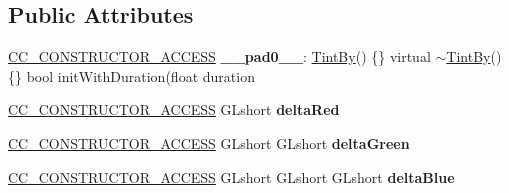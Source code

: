 \subsection*{Public Attributes}
\begin{DoxyCompactItemize}
\item 
\mbox{\label{classTintBy_a6f64181fb1cf3d990e27d955b9ebe9f1}} 
\hyperlink{_2cocos2d_2cocos_2base_2ccConfig_8h_a25ef1314f97c35a2ed3d029b0ead6da0}{C\+C\+\_\+\+C\+O\+N\+S\+T\+R\+U\+C\+T\+O\+R\+\_\+\+A\+C\+C\+E\+SS} {\bfseries \+\_\+\+\_\+pad0\+\_\+\+\_\+}\+: \hyperlink{classTintBy}{Tint\+By}() \{\} virtual $\sim$\hyperlink{classTintBy}{Tint\+By}() \{\} bool init\+With\+Duration(float duration
\item 
\mbox{\label{classTintBy_a5c2b3a4dba709fd617c256b4df056972}} 
\hyperlink{_2cocos2d_2cocos_2base_2ccConfig_8h_a25ef1314f97c35a2ed3d029b0ead6da0}{C\+C\+\_\+\+C\+O\+N\+S\+T\+R\+U\+C\+T\+O\+R\+\_\+\+A\+C\+C\+E\+SS} G\+Lshort {\bfseries delta\+Red}
\item 
\mbox{\label{classTintBy_a878148085b6eed4091d1df5293729eec}} 
\hyperlink{_2cocos2d_2cocos_2base_2ccConfig_8h_a25ef1314f97c35a2ed3d029b0ead6da0}{C\+C\+\_\+\+C\+O\+N\+S\+T\+R\+U\+C\+T\+O\+R\+\_\+\+A\+C\+C\+E\+SS} G\+Lshort G\+Lshort {\bfseries delta\+Green}
\item 
\mbox{\label{classTintBy_ac99cf8fc38d777f8ce6d037729b5f7bc}} 
\hyperlink{_2cocos2d_2cocos_2base_2ccConfig_8h_a25ef1314f97c35a2ed3d029b0ead6da0}{C\+C\+\_\+\+C\+O\+N\+S\+T\+R\+U\+C\+T\+O\+R\+\_\+\+A\+C\+C\+E\+SS} G\+Lshort G\+Lshort G\+Lshort {\bfseries delta\+Blue}
\end{DoxyCompactItemize}
